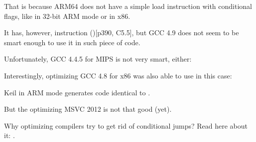 That is because ARM64 does not have a simple load instruction with conditional flags,
like  in 32-bit ARM mode or  in x86.

It has, however,  instruction ()[\ARMSixFourRef p390, C5.5],
but GCC 4.9 does not seem to be smart enough to use it in such piece of code.


Unfortunately, GCC 4.4.5 for MIPS is not very smart, either:







Interestingly, optimizing GCC 4.8 for x86 was also able to use  in this case:



\Optimizing Keil in ARM mode generates code identical to .

But the optimizing MSVC 2012 is not that good (yet).

\subsectionold{\Conclusion{}}

Why optimizing compilers try to get rid of conditional jumps? Read here about it: .
